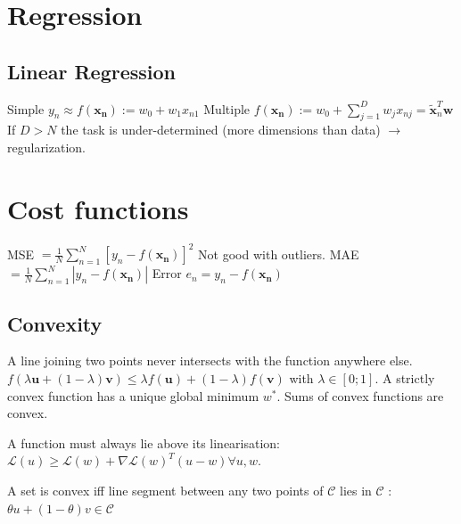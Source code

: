 \section{Regression}
\subsection{Linear Regression}
Simple
$y_n \approx f(\mathbf{x_n}) := w_0 + w_1 x_{n1}$\newline
Multiple\newline
$f(\mathbf{x_n}) := w_0 + \sum_{j=1}^D w_j x_{nj} = \tilde{\mathbf{x}}_n^T \mathbf{w}$\newline
If $D > N$ the task is under-determined (more dimensions than data) $\rightarrow$ regularization.

\section{Cost functions}
MSE $= \frac{1}{N} \sum_{n=1}^N [y_n - f(\mathbf{x_n})]^2$ Not good with outliers.\newline
MAE $= \frac{1}{N} \sum_{n=1}^N |y_n - f(\mathbf{x_n})|$\newline
Error $e_n = y_n - f(\mathbf{x_n})$
\subsection{Convexity}
A line joining two points never intersects with the function anywhere else.
$f(\lambda \mathbf{u} + (1-\lambda)\mathbf{v}) \le \lambda f(\mathbf{u}) + (1-\lambda) f(\mathbf{v})$ with $\lambda \in [0;1]$.
A strictly convex function has a unique global minimum $w^*$. Sums of convex functions are convex.

A function must always lie above its linearisation: \newline $\mathcal{L}(u) \ge \mathcal{L}(w) + \nabla \mathcal{L}(w)^T (u-w) \forall u,w$.

A set is convex iff line segment between any two points of $\mathcal{C}$ lies in $\mathcal{C}$ : $\theta u + (1 - \theta) v \in \mathcal{C}$

